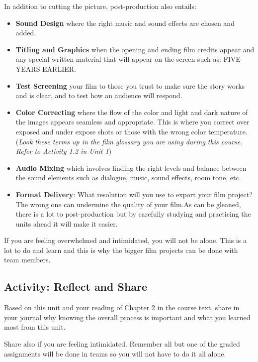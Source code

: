 \documentclass[
]{book}
\begin{document}
In addition to cutting the picture, post-production also entails:

\begin{itemize}
\item
  \textbf{Sound Design} where the right music and sound effects are chosen and added.
\item
  \textbf{Titling and Graphics} when the opening and ending film credits appear and any special written material that will appear on the screen such as: FIVE YEARS EARLIER.
\item
  \textbf{Test Screening} your film to those you trust to make sure the story works and is clear, and to test how an audience will respond.
\item
  \textbf{Color Correcting} where the flow of the color and light and dark nature of the images appears seamless and appropriate. This is where you correct over exposed and under expose shots or those with the wrong color temperature. (\emph{Look these terms up in the film glossary you are using during this course. Refer to Activity 1.2 in Unit 1})
\item
  \textbf{Audio Mixing} which involves finding the right levels and balance between the sound elements such as dialogue, music, sound effects, room tone, etc.
\item
  \textbf{Format Delivery}: What resolution will you use to export your film project? The wrong one can undermine the quality of your film.As can be gleaned, there is a lot to post-production but by carefully studying and practicing the units ahead it will make it easier.
\end{itemize}

If you are feeling overwhelmed and intimidated, you will not be alone. This is a lot to do and learn and this is why the bigger film projects can be done with team members.

\hypertarget{activity-reflect-and-share}{%
\subsection*{Activity: Reflect and Share}\label{activity-reflect-and-share}}

\begin{reflect}
Based on this unit and your reading of Chapter 2 in the course text, share in your journal why knowing the overall process is important and what you learned most from this unit.

Share also if you are feeling intimidated. Remember all but one of the graded assignments will be done in teams so you will not have to do it all alone.
\end{reflect}
\end{document}
